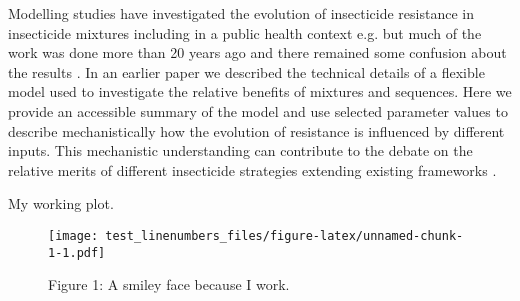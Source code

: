 \documentclass[11pt,]{article}
\begin{document}
Modelling studies have investigated the evolution of insecticide
resistance in insecticide mixtures including in a public health context
e.g. \citep{Curtis1985}\citep{Mani1985}\citep{Roush1989} but much of the
work was done more than 20 years ago and there remained some confusion
about the results \citep{Levick2017}. In an earlier paper
\citep{Levick2017} we described the technical details of a flexible
model used to investigate the relative benefits of mixtures and
sequences. Here we provide an accessible summary of the model and use
selected parameter values to describe mechanistically how the evolution
of resistance is influenced by different inputs. This mechanistic
understanding can contribute to the debate on the relative merits of
different insecticide strategies extending existing frameworks
\citep{Roush1989}\citep{IRAC2011}\citep{FAO2012}\citep{WHO2012}.

My working plot.

\begin{figure}[htbp]
\centering
\texttt{[image: test\_linenumbers\_files/figure-latex/unnamed-chunk-1-1.pdf]}
\caption{Figure 1: A smiley face because I work.}
\end{figure}


\end{document}
